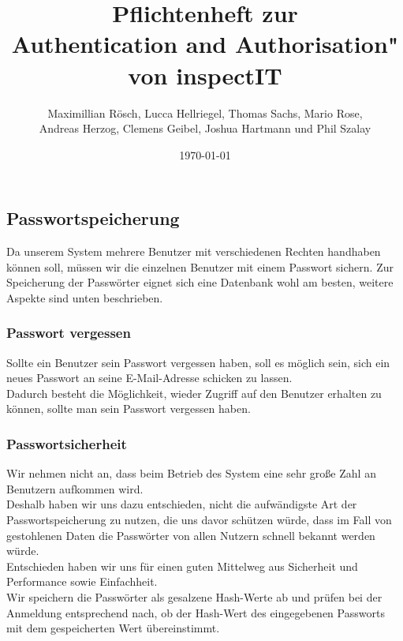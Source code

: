 \documentclass[titlepage]{article}
\newcommand{\TeamNovaTec}{Maximillian Rösch, Lucca Hellriegel, Thomas Sachs, Mario Rose, \\ Andreas Herzog, Clemens Geibel, Joshua Hartmann und Phil Szalay}
\begin{document}
\pagestyle{fancy}
\fancyhf{}
\renewcommand{\headrulewidth}{0.2pt}
\renewcommand{\footrulewidth}{0.2pt}

\begin{titlepage}
\title{Pflichtenheft zur\\ \grqq Authentication and Authorisation" \\von inspectIT}
\date{\today}
\author{\TeamNovaTec}
\maketitle
\end{titlepage}

\tableofcontents
\newpage


\subsection{Passwortspeicherung}
Da unserem System mehrere Benutzer mit verschiedenen Rechten handhaben können soll, müssen wir die einzelnen Benutzer mit einem Passwort sichern.
Zur Speicherung der Passwörter eignet sich eine Datenbank wohl am besten, weitere Aspekte sind unten beschrieben.

\subsubsection{Passwort vergessen}
Sollte ein Benutzer sein Passwort vergessen haben, soll es möglich sein, sich ein neues Passwort an seine E-Mail-Adresse schicken zu lassen.\\
Dadurch besteht die Möglichkeit, wieder Zugriff auf den Benutzer erhalten zu können, sollte man sein Passwort vergessen haben. 

\subsubsection{Passwortsicherheit}
Wir nehmen nicht an, dass beim Betrieb des System eine sehr große Zahl an Benutzern aufkommen wird.\\
Deshalb haben wir uns dazu entschieden, nicht die aufwändigste Art der Passwortspeicherung zu nutzen, die uns davor schützen würde, dass im Fall von gestohlenen Daten die Passwörter von allen Nutzern schnell
bekannt werden würde.\\
Entschieden haben wir uns für einen guten Mittelweg aus Sicherheit und Performance sowie Einfachheit.\\
Wir speichern die Passwörter als gesalzene Hash-Werte ab und prüfen bei der Anmeldung entsprechend nach, ob der Hash-Wert des eingegebenen Passworts mit dem gespeicherten Wert übereinstimmt.\\
\end{document}
